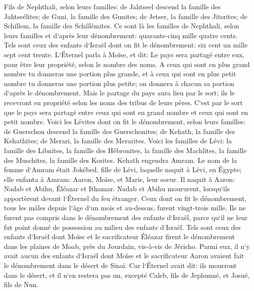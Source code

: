 \verse Fils de Nephthali, selon leurs familles: de Jahtseel descend la famille des Jahtseélites; de Guni, la famille des Gunites; 
\verse de Jetser, la famille des Jitsrites; de Schillem, la famille des Schillémites. 
\verse Ce sont là les familles de Nephthali, selon leurs familles et d`après leur dénombrement: quarante-cinq mille quatre cents. 
\verse Tels sont ceux des enfants d`Israël dont on fit le dénombrement: six cent un mille sept cent trente. 
\verse L`Éternel parla à Moïse, et dit: 
\verse Le pays sera partagé entre eux, pour être leur propriété, selon le nombre des noms. 
\verse A ceux qui sont en plus grand nombre tu donneras une portion plus grande, et à ceux qui sont en plus petit nombre tu donneras une portion plus petite; on donnera à chacun sa portion d`après le dénombrement. 
\verse Mais le partage du pays aura lieu par le sort; ils le recevront en propriété selon les noms des tribus de leurs pères. 
\verse C`est par le sort que le pays sera partagé entre ceux qui sont en grand nombre et ceux qui sont en petit nombre. 
\verse Voici les Lévites dont on fit le dénombrement, selon leurs familles: de Guerschon descend la famille des Guerschonites; de Kehath, la famille des Kehathites; de Merari, la famille des Merarites. 
\verse Voici les familles de Lévi: la famille des Libnites, la famille des Hébronites, la famille des Machlites, la famille des Muschites, la famille des Korites. Kehath engendra Amram. 
\verse Le nom de la femme d`Amram était Jokébed, fille de Lévi, laquelle naquit à Lévi, en Égypte; elle enfanta à Amram: Aaron, Moïse, et Marie, leur soeur. 
\verse Il naquit à Aaron: Nadab et Abihu, Éléazar et Ithamar. 
\verse Nadab et Abihu moururent, lorsqu`ils apportèrent devant l`Éternel du feu étranger. 
\verse Ceux dont on fit le dénombrement, tous les mâles depuis l`âge d`un mois et au-dessus, furent vingt-trois mille. Ils ne furent pas compris dans le dénombrement des enfants d`Israël, parce qu`il ne leur fut point donné de possession au milieu des enfants d`Israël. 
\verse Tels sont ceux des enfants d`Israël dont Moïse et le sacrificateur Éléazar firent le dénombrement dans les plaines de Moab, près du Jourdain, vis-à-vis de Jéricho. 
\verse Parmi eux, il n`y avait aucun des enfants d`Israël dont Moïse et le sacrificateur Aaron avaient fait le dénombrement dans le désert de Sinaï. 
\verse Car l`Éternel avait dit: ils mourront dans le désert, et il n`en restera pas un, excepté Caleb, fils de Jephunné, et Josué, fils de Nun. 

